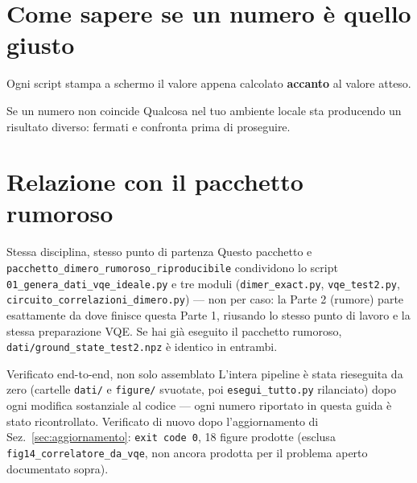 \documentclass[11pt,a4paper]{article}
\newcommand{\code}[1]{\texttt{\small #1}}
\begin{document}
\section{Come sapere se un numero è quello giusto}

Ogni script stampa a schermo il valore appena calcolato \textbf{accanto}
al valore atteso.

\begin{warnbox}{Se un numero non coincide}
Qualcosa nel tuo ambiente locale sta producendo un risultato diverso:
fermati e confronta prima di proseguire.
\end{warnbox}

\section{Relazione con il pacchetto rumoroso}

\begin{okbox}{Stessa disciplina, stesso punto di partenza}
Questo pacchetto e \code{pacchetto\_dimero\_rumoroso\_riproducibile}
condividono lo script \code{01\_genera\_dati\_vqe\_ideale.py} e tre
moduli (\code{dimer\_exact.py}, \code{vqe\_test2.py},
\code{circuito\_correlazioni\_dimero.py}) --- non per caso: la Parte 2
(rumore) parte esattamente da dove finisce questa Parte 1, riusando lo
stesso punto di lavoro e la stessa preparazione VQE. Se hai già
eseguito il pacchetto rumoroso, \code{dati/ground\_state\_test2.npz} è
identico in entrambi.
\end{okbox}

\begin{okbox}{Verificato end-to-end, non solo assemblato}
L'intera pipeline è stata rieseguita da zero (cartelle \code{dati/} e
\code{figure/} svuotate, poi \code{esegui\_tutto.py} rilanciato) dopo
ogni modifica sostanziale al codice --- ogni numero riportato in questa
guida è stato ricontrollato. Verificato di nuovo dopo l'aggiornamento
di Sez.~\ref{sec:aggiornamento}: \code{exit code 0}, 18 figure prodotte
(esclusa \code{fig14\_correlatore\_da\_vqe}, non ancora prodotta per il
problema aperto documentato sopra).
\end{okbox}
\end{document}
